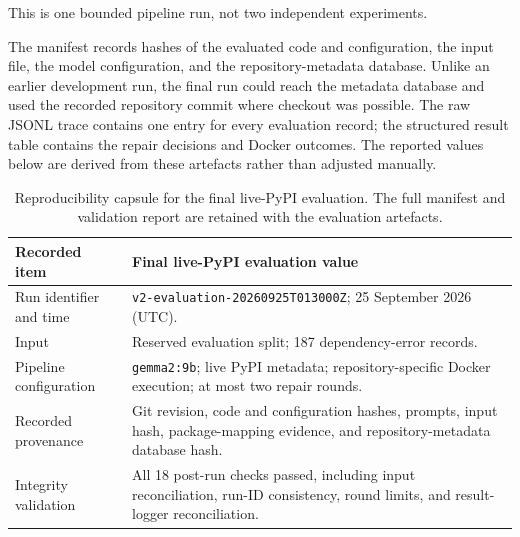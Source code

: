 This is one bounded pipeline run, not two independent experiments.

The manifest records hashes of the evaluated code and configuration, the input
file, the model configuration, and the repository-metadata database. Unlike an
earlier development run, the final run could reach the metadata database and
used the recorded repository commit where checkout was possible. The raw JSONL
trace contains one entry for every evaluation record; the structured result
table contains the repair decisions and Docker outcomes. The reported values
below are derived from these artefacts rather than adjusted manually.
\label{sec:v-final-manifest}

\begin{table}[htbp]
  \centering
  \small
  \setlength{\tabcolsep}{4pt}
  \begin{tabular}{|p{3.8cm}|p{7.2cm}|}
    \hline
    \textbf{Recorded item} & \textbf{Final live-PyPI evaluation value} \\
    \hline
    Run identifier and time & \texttt{v2-evaluation-20260925T013000Z}; 25 September 2026 (UTC). \\
    \hline
    Input & Reserved evaluation split; 187 dependency-error records. \\
    \hline
    Pipeline configuration & \texttt{gemma2:9b}; live PyPI metadata; repository-specific Docker execution; at most two repair rounds. \\
    \hline
    Recorded provenance & Git revision, code and configuration hashes, prompts, input hash, package-mapping evidence, and repository-metadata database hash. \\
    \hline
    Integrity validation & All 18 post-run checks passed, including input reconciliation, run-ID consistency, round limits, and result-logger reconciliation. \\
    \hline
  \end{tabular}
  \caption{Reproducibility capsule for the final live-PyPI evaluation. The full manifest and validation report are retained with the evaluation artefacts.}
  \label{tab:v-final-reproducibility}
\end{table}

